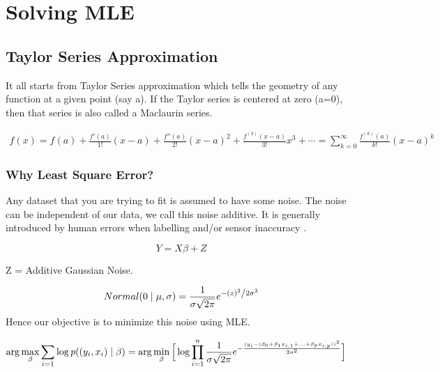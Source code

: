 \chapter{Solving MLE}

\section{Taylor Series Approximation}

It all starts from Taylor Series approximation which tells the geometry of any function at a given point (say a). If the Taylor series is centered at zero (a=0), then that series is also called a Maclaurin series. 

\begin{equation}
\begin{split}
f(x) = f(a) + \frac{f'(a)}{1!}(x-a) + \frac{f''(a)}{2!}(x-a)^2 + \frac{f^{(3)}(x-a)}{3!}x^3 + \dotsb = \sum_{k=0}^\infty \frac{f^{\left(k\right)}(a)}{k!} (x-a)^k
\end{split}
\end{equation}

  
\subsection{Why Least Square Error?}
Any dataset that you are trying to fit is assumed to have some noise. The noise can be independent of our data, we call this noise additive. It is generally introduced by human errors when labelling and/or sensor inaccuracy \cite{why-lse}.

\begin{equation}
    Y = X\beta + Z
\end{equation}

Z = Additive Gaussian Noise. 

\begin{equation}
Normal(0 \mid \mu,\sigma) = \frac{1}{{\sigma \sqrt {2\pi } }}e^{{{ - \left( {z} \right)^2 } \mathord{\left/ {\vphantom {{ - \left( {z } \right)^2 } {2\sigma ^2 }}} \right. \kern-\nulldelimiterspace} {2\sigma ^2 }}}

\end{equation}
Hence our objective is to minimize this noise using MLE. 


\begin{equation}
\begin{split}
    \arg\max_{\beta} \sum_{i=1} \log p( (y_i,x_i) \mid \beta) & = \arg\min_{\bf \beta} \Big[ \log \prod_{i=1}^{n} \frac{1}{\sigma\sqrt{2\pi}}e^{-\frac{(y_i- (\beta_0 + \beta_1 x_{i,1} + ... + \beta_p x_{i,p}))^2}{2\sigma^2}} \Big] 
    \end{split}
\end{equation}




